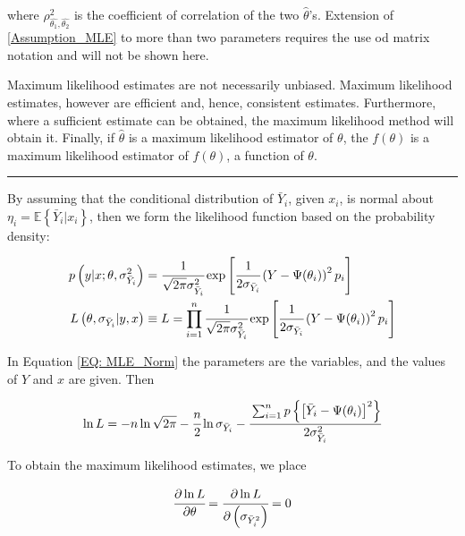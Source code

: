 \documentclass[a4paper,fleqn]{cas-dc}
\begin{document}
where $\rho^2_{\hat{\theta_1}, \hat{\theta_2}}$ is the coefficient of correlation of the two $\hat{\theta}$'s. Extension of \ref{Assumption_MLE} to more than two parameters requires the use od matrix notation and will not be shown here.

Maximum likelihood estimates are not necessarily unbiased. Maximum likelihood estimates, however are efficient and, hence, consistent estimates. Furthermore, where a sufficient estimate can be obtained, the maximum likelihood method will obtain it. Finally, if $\hat{\theta}$ is a maximum likelihood estimator of $\theta$, the $f\left( \theta \right)$ is a maximum likelihood estimator of $f\left( \theta \right)$, a function of $\theta$.

\hrule

By assuming that the conditional distribution of $\bar{Y}_i$, given $x_i$, is normal about $\eta_i = \mathbb{E}\left\{ \bar{Y}_i | x_i \right\}$, then we form the likelihood function based on the probability density:

{\footnotesize
\begin{align} \label{EQ: MLE_Norm}
	p\left( y | x; \theta, \sigma^2_{\bar{Y}_i} \right) &= \cfrac{1}{\sqrt{2 \pi} \sigma^2_{\bar{Y}_i} } \exp \left[ \cfrac{1}{2  \sigma_{\bar{Y}_i} } \left( Y - \Psi(\theta_i) \right)^2 p_i \right] \nonumber \\
	L\left( \theta, \sigma_{\bar{Y}_i} | y,x \right) &\equiv L = \prod_{i=1}^{n} \cfrac{1}{\sqrt{2 \pi} \sigma^2_{\bar{Y}_i} } \exp \left[ \cfrac{1}{2  \sigma_{\bar{Y}_i} } \left( Y - \Psi(\theta_i) \right)^2 p_i \right]
\end{align}}

In Equation \ref{EQ: MLE_Norm} the parameters are the variables, and the values of $Y$ and $x$ are given. Then

{\footnotesize
	\begin{equation}
		\ln L = -n \ln \sqrt{2 \pi} - \cfrac{n}{2} \ln \sigma_{\bar{Y}_i}
		- \cfrac{ \sum_{i=1}^{n} p \left\{ \left[  \bar{Y}_i - \Psi(\theta_i) \right]^2 \right\} }{2 \sigma^2_{\bar{Y}_i}}
	\end{equation}
	}

To obtain the maximum likelihood estimates, we place

{\footnotesize
	\begin{equation}
		\cfrac{\partial \ln L}{\partial \theta} = \cfrac{\partial \ln L}{\partial \left( \sigma_{\bar{Y}^2_i} \right)} = 0
	\end{equation}
}
\end{document}
